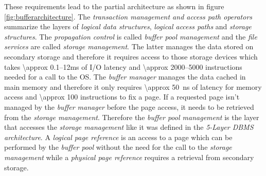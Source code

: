 	These requirements lead to the partial architecture as shown in figure \ref{fig:bufferarchitecture}. The \emph{transaction management and access path operators} summarize the layers of \emph{logical data structures}, \emph{logical access paths} and \emph{storage structures}. The \emph{propagation control} is called \emph{buffer pool management} and the \emph{file services} are called \emph{storage management}. The latter manages the data stored on secondary storage and therefore it requires access to those storage devices which takes \numrange{\approx 0.1}{12}\si{\milli\second} of I/O latency and \numrange{\approx 2000}{5000} instructions needed for a call to the OS. The \emph{buffer manager} manages the data cached in main memory and therefore it only requires \SI{\approx 50}{\nano\second} of latency for memory access and \num{\approx 100} instructions to fix a page. If a requested page isn't managed by the \emph{buffer manager} before the page access, it needs to be retrieved from the \emph{storage management}. Therefore the \emph{buffer pool management} is the layer that accesses the \emph{storage management} like it was defined in the \emph{5-Layer DBMS architecture}. A \emph{logical page reference} is an access to a page which can be performed by the \emph{buffer pool} without the need for the call to the \emph{storage management} while a \emph{physical page reference} requires a retrieval from secondary storage.
	
